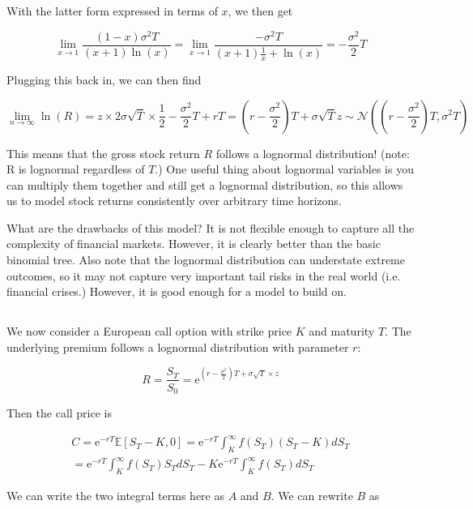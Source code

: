 \documentclass[12pt, letterpaper]{article}
\newcommand{\e}{\mathrm{e}}
\newcommand{\Ex}[1]{\mathbb{E}\left[#1\right]}
\begin{document}
    With the latter form expressed in terms of \(x\), we then get 

    \[ \lim_{x \rightarrow 1} \frac{(1 - x) \sigma^2 T}{(x + 1) \ln(x)} = \lim_{x \rightarrow 1} \frac{- \sigma^2 T }{(x + 1) \frac{1}{x} + \ln(x)} = - \frac{\sigma^2}{2} T   \]

    Plugging this back in, we can then find

    \[ \lim_{n \rightarrow \infty} \ln(R) = z \times 2 \sigma \sqrt{T} \times \frac{1}{2} - \frac{\sigma^2}{2} T + rT = \left( r - \frac{\sigma^2}{2}  \right) T + \sigma \sqrt{T} z \sim \mathcal{N}\left( \left(r - \frac{\sigma^2}{2}  \right) T , \sigma^2 T \right)   \]

    This means that the gross stock return \(R\) follows a lognormal distribution! (note: R is lognormal regardless of \(T\).) One useful thing about lognormal variables is you can multiply them together and still get a lognormal distribution, so this allows us to model stock returns consistently over arbitrary time horizons. 

    What are the drawbacks of this model? It is not flexible enough to capture all the complexity of financial markets. However, it is clearly better than the basic binomial tree. Also note that the lognormal distribution can understate extreme outcomes, so it may not capture very important tail risks in the real world (i.e. financial crises.) However, it is good enough for a model to build on.

    \subsection{}

    We now consider a European call option with strike price \(K\) and maturity \(T\). The underlying premium follows a lognormal distribution with parameter \(r\): 

    \[ R = \frac{S_T}{S_0} = \e^{\left( r - \frac{\sigma^2}{2} \right) T + \sigma \sqrt{T} \times z}  \]

    Then the call price is 

    \begin{align*}
    C = \e^{-rT} \Ex{S_T - K, 0} = \e^{-rT} \int_K^\infty f(S_T) (S_T - K) dS_T \\ = \e^{-rT} \int_K^\infty f(S_T) S_T dS_T - K \e^{-rT} \int_K^\infty f(S_T) dS_T
    \end{align*}

    We can write the two integral terms here as \(A\) and \(B\). We can rewrite \(B\) as 
\end{document}
